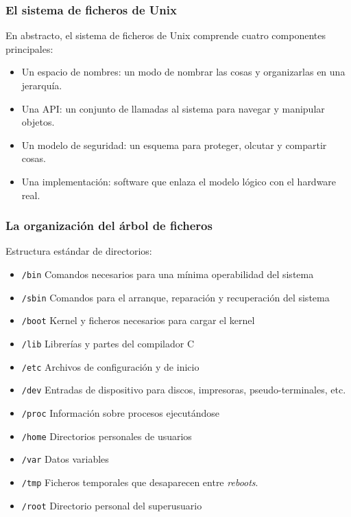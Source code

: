 \documentclass{beamer}
\begin{document}
\begin{frame}
  \frametitle{El sistema de ficheros de Unix}

En abstracto, el sistema de ficheros de Unix comprende cuatro componentes principales:

  \begin{itemize}
    \item Un \alert{espacio de nombres}: un modo de nombrar las cosas y organizarlas en una jerarquía.
    \item Una \alert{API}: un conjunto de llamadas al sistema para navegar y manipular objetos.
    \item Un \alert{modelo de seguridad}: un esquema para proteger, olcutar y compartir cosas.
    \item Una \alert{implementación}: software que enlaza el modelo lógico con el hardware real.
  \end{itemize}
\end{frame}

\begin{frame}
  \frametitle{La organización del árbol de ficheros}

Estructura estándar de directorios:

  \begin{itemize}

\small
    \item \alert{\texttt{/bin}} Comandos necesarios para una mínima operabilidad del sistema 
    \item \alert{\texttt{/sbin}} Comandos para el arranque, reparación y recuperación del sistema
    \item \alert{\texttt{/boot}} Kernel y ficheros necesarios para cargar el kernel 
    \item \alert{\texttt{/lib}} Librerías y partes del compilador C
    \item \alert{\texttt{/etc}} Archivos de configuración y de inicio 
    \item \alert{\texttt{/dev}} Entradas de dispositivo para discos, impresoras, pseudo-terminales, etc.
    \item \alert{\texttt{/proc}} Información sobre procesos ejecutándose
    \item \alert{\texttt{/home}} Directorios personales de usuarios
    \item \alert{\texttt{/var}} Datos variables 
    \item \alert{\texttt{/tmp}} Ficheros temporales que desaparecen entre \textit{reboots}.
    \item \alert{\texttt{/root}} Directorio personal del superusuario 

  \end{itemize}

\normalsize

\end{frame}
\end{document}
